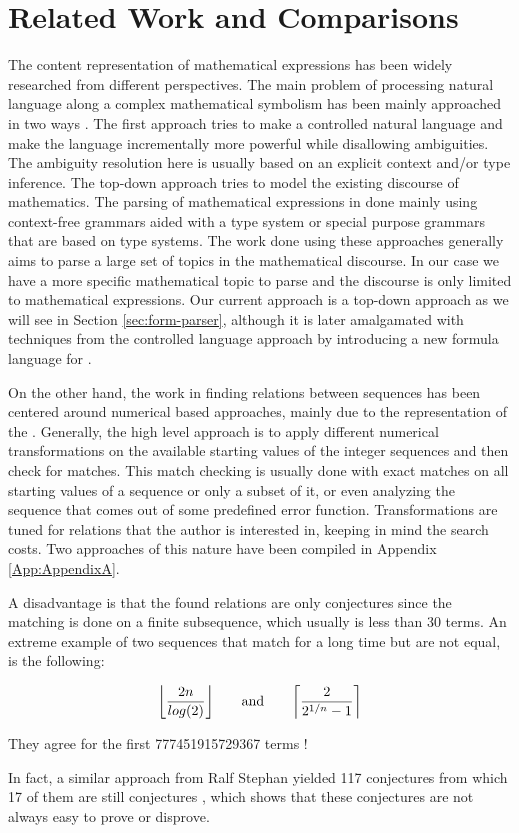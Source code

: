 \section{Related Work and Comparisons} \label{sec:Related}

The content representation of mathematical expressions has been widely researched from
different perspectives. The main problem of processing natural language along a complex
mathematical symbolism has been mainly approached in two ways \cite{Ginev-11}. The first
approach tries to make a controlled natural language and make the language incrementally
more powerful while disallowing ambiguities. The ambiguity resolution here is usually
based on an explicit context and/or type inference. The top-down approach tries to model
the existing discourse of mathematics.  The parsing of mathematical expressions in done
mainly using context-free grammars aided with a type system or special purpose grammars
that are based on type systems. The work done using these approaches generally aims to
parse a large set of topics in the mathematical discourse. In our case we have a more
specific mathematical topic to parse and the discourse is only limited to mathematical
expressions. Our current approach is a top-down approach as we will see in Section
\ref{sec:form-parser}, although it is later amalgamated with techniques from the
controlled language approach by introducing a new formula language for \oeis.

On the other hand, the work in finding relations between sequences has been centered
around numerical based approaches, mainly due to the representation of the
\oeis. Generally, the high level approach is to apply different numerical transformations
on the available starting values of the integer sequences and then check for matches. This
match checking is usually done with exact matches on all starting values of a sequence or
only a subset of it, or even analyzing the sequence that comes out of some predefined
error function. Transformations are tuned for relations that the author is interested in,
keeping in mind the search costs. Two approaches of this nature have been compiled in
Appendix \ref{App:AppendixA}.

A disadvantage is that the found relations are only conjectures since the matching is done on a finite subsequence,
which usually is less than 30 terms. An extreme example of two sequences that match for a long time but are not
equal, is the following:

$$\floor*{\frac{2n}{log(2)}}  \qquad\text{and}\qquad \ceil*{\frac{2}{2^{1/n}-1}}$$

They agree for the first 777451915729367 terms \cite{oeis-paper2}!

In fact, a similar approach from Ralf Stephan \cite{Ralf} yielded 117 conjectures from
which 17 of them are still conjectures \cite{RalfUpdates}, which shows that these
conjectures are not always easy to prove or disprove.


